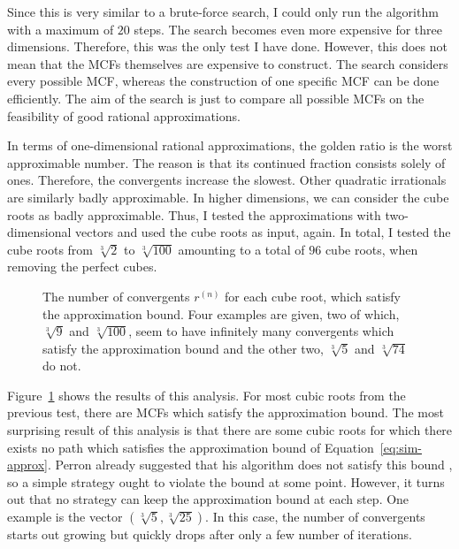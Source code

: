 Since this is very similar to a brute-force search, I could only run the
algorithm with a maximum of $20$ steps.
The search becomes even more expensive for three dimensions.
Therefore, this was the only test I have done.
However, this does not mean that the MCFs themselves are expensive to
construct.
The search considers every possible MCF,
whereas the construction of one specific MCF can be done efficiently.
The aim of the search is just to compare all possible MCFs on the feasibility
of good rational approximations.

In terms of one-dimensional rational approximations,
the golden ratio is the worst approximable number.
The reason is that its continued fraction consists solely of ones.
Therefore, the convergents increase the slowest.
Other quadratic irrationals are similarly badly approximable.
In higher dimensions, we can consider the cube roots as badly approximable.
Thus, I tested the approximations with two-dimensional vectors and used the
cube roots as input, again.
In total, I tested the cube roots from $\sqrt[3]{2}$ to $\sqrt[3]{100}$
amounting to a total of $96$ cube roots, when removing the perfect cubes.

\begin{figure}[tbp]
  \centering
  
  \caption{
    The number of convergents $r^{(n)}$ for each cube root, which
    satisfy the approximation bound.
    Four examples are given,
    two of which, $\sqrt[3]{9}$ and $\sqrt[3]{100}$, seem to have infinitely
    many convergents which satisfy the approximation bound and the other two,
    $\sqrt[3]{5}$ and $\sqrt[3]{74}$ do not.
  }
  \label{fig:results-approx}
\end{figure}

Figure~\ref{fig:results-approx} shows the results of this analysis.
For most cubic roots from the previous test,
there are MCFs which satisfy the approximation bound.
The most surprising result of this analysis is that there are some cubic roots
for which there exists no path which satisfies the approximation bound of Equation~\ref{eq:sim-approx}.
Perron already suggested that his algorithm does not satisfy this bound \cite{Perron07},
so a simple strategy ought to violate the bound at some point.
However, it turns out that no strategy can keep the approximation bound at each step.
One example is the vector $(\sqrt[3]{5}, \sqrt[3]{25})$.
In this case, the number of convergents starts out growing but quickly drops
after only a few number of iterations.

